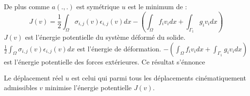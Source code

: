 \documentclass[12pt]{book}
\begin{document}
De plus comme $a(.,.)$ est sym\'etrique $u$ est le minimum de :
\begin{equation}
J(v)=\frac{1}{2}\int_\Omega
\sigma_{i,j}(v)\epsilon_{i,j}(v)dx-(\int_\Omega 
f_iv_idx+\int_{\Gamma_1}g_iv_idx) 
\end{equation}
$J(v)$  est l'\'energie potentielle du syst\`eme d\'eform\'e du
solide.
$\frac{1}{2}\int_\Omega \sigma_{i,j}(v)\epsilon_{i,j}(v)dx$ est
l'\'energie de d\'eformation. $-(\int_\Omega
f_iv_idx+\int_{\Gamma_1}g_iv_idx)$ est l'\'energie potentielle
des forces ext\'erieures.
Ce r\'esultat\cite{ma:equad:Raviart85,ph:mecac:Perez95} s'\'ennonce
\begin{prin}
Le d\'eplacement r\'eel $u$ est celui qui parmi tous les
d\'eplacements cin\'ematiquement admissibles $v$ minimise l'\'energie
potentielle $J(v)$.
\end{prin}
\end{document}
